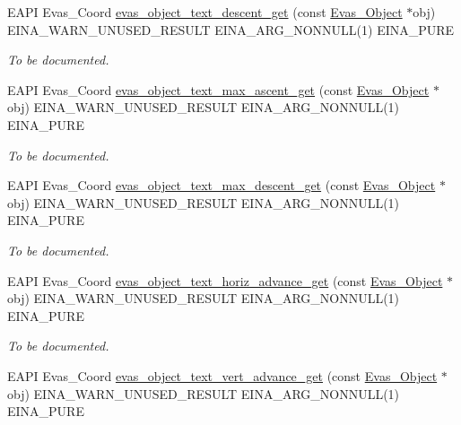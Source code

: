 \begin{DoxyCompactItemize}
EAPI Evas\_\-Coord \hyperlink{group__Evas__Object__Text_ga71f9d96c6dfc8ec33cf0a97e614228a0}{evas\_\-object\_\-text\_\-descent\_\-get} (const \hyperlink{group__Evas__Object__Group_ga9e19e6dd1f517a0ba437c0114d3e7c97}{Evas\_\-Object} $\ast$obj) EINA\_\-WARN\_\-UNUSED\_\-RESULT EINA\_\-ARG\_\-NONNULL(1) EINA\_\-PURE
\begin{DoxyCompactList}\small\item\em To be documented. \item\end{DoxyCompactList}\item 
EAPI Evas\_\-Coord \hyperlink{group__Evas__Object__Text_ga1a0bdf57c3ca6e7fb7833ddfbe23b735}{evas\_\-object\_\-text\_\-max\_\-ascent\_\-get} (const \hyperlink{group__Evas__Object__Group_ga9e19e6dd1f517a0ba437c0114d3e7c97}{Evas\_\-Object} $\ast$obj) EINA\_\-WARN\_\-UNUSED\_\-RESULT EINA\_\-ARG\_\-NONNULL(1) EINA\_\-PURE
\begin{DoxyCompactList}\small\item\em To be documented. \item\end{DoxyCompactList}\item 
EAPI Evas\_\-Coord \hyperlink{group__Evas__Object__Text_ga28ee3eb5e199c23a14ac47e07ac49205}{evas\_\-object\_\-text\_\-max\_\-descent\_\-get} (const \hyperlink{group__Evas__Object__Group_ga9e19e6dd1f517a0ba437c0114d3e7c97}{Evas\_\-Object} $\ast$obj) EINA\_\-WARN\_\-UNUSED\_\-RESULT EINA\_\-ARG\_\-NONNULL(1) EINA\_\-PURE
\begin{DoxyCompactList}\small\item\em To be documented. \item\end{DoxyCompactList}\item 
EAPI Evas\_\-Coord \hyperlink{group__Evas__Object__Text_ga972494bd4b9d807ea5f98404a82d8eab}{evas\_\-object\_\-text\_\-horiz\_\-advance\_\-get} (const \hyperlink{group__Evas__Object__Group_ga9e19e6dd1f517a0ba437c0114d3e7c97}{Evas\_\-Object} $\ast$obj) EINA\_\-WARN\_\-UNUSED\_\-RESULT EINA\_\-ARG\_\-NONNULL(1) EINA\_\-PURE
\begin{DoxyCompactList}\small\item\em To be documented. \item\end{DoxyCompactList}\item 
EAPI Evas\_\-Coord \hyperlink{group__Evas__Object__Text_gaec17348b4fa02b15162ef96abdbfbf41}{evas\_\-object\_\-text\_\-vert\_\-advance\_\-get} (const \hyperlink{group__Evas__Object__Group_ga9e19e6dd1f517a0ba437c0114d3e7c97}{Evas\_\-Object} $\ast$obj) EINA\_\-WARN\_\-UNUSED\_\-RESULT EINA\_\-ARG\_\-NONNULL(1) EINA\_\-PURE

\end{DoxyCompactItemize}

